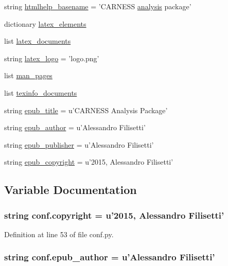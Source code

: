 \begin{DoxyCompactItemize}
\item 
string \hyperlink{a00101_aab7fddb2766ce3c430d8246fbfdbc7b1}{htmlhelp\-\_\-basename} = 'C\-A\-R\-N\-E\-S\-S \hyperlink{a00025_abf6e5638a23a2531114655f3f690b70c}{analysis} package'
\item 
dictionary \hyperlink{a00101_a33619d385ad23765ac6ebb58bf82d43d}{latex\-\_\-elements}
\item 
list \hyperlink{a00101_a7812f49970f3de0d15dd7b9b9a10e3a1}{latex\-\_\-documents}
\item 
string \hyperlink{a00101_a8baea114415f64e8f5aad390f5cd4230}{latex\-\_\-logo} = 'logo.\-png'
\item 
list \hyperlink{a00101_a85efc5fee48a26fa2d651f6eeb38fc2b}{man\-\_\-pages}
\item 
list \hyperlink{a00101_a54b0faed214ac92017d5689efbb10672}{texinfo\-\_\-documents}
\item 
string \hyperlink{a00101_a9e0d62d22b83ce34deb3f16ba63cedfe}{epub\-\_\-title} = u'C\-A\-R\-N\-E\-S\-S Analysis Package'
\item 
string \hyperlink{a00101_a986ebf7aa037c6bf39add300ab98a611}{epub\-\_\-author} = u'Alessandro Filisetti'
\item 
string \hyperlink{a00101_a13c40319d84c9383e0d119773cc1ed02}{epub\-\_\-publisher} = u'Alessandro Filisetti'
\item 
string \hyperlink{a00101_a443008520a058a726d07c6b5ccf45366}{epub\-\_\-copyright} = u'2015, Alessandro Filisetti'
\end{DoxyCompactItemize}


\subsection{Variable Documentation}
\hypertarget{a00101_a33fa97cf51dcb25970fbf53f10159589}{
\subsubsection[{copyright}]{\setlength{\rightskip}{0pt plus 5cm}string conf.\-copyright = u'2015, Alessandro Filisetti'}}\label{a00101_a33fa97cf51dcb25970fbf53f10159589}


Definition at line 53 of file conf.\-py.

\hypertarget{a00101_a986ebf7aa037c6bf39add300ab98a611}{
\subsubsection[{epub\-\_\-author}]{\setlength{\rightskip}{0pt plus 5cm}string conf.\-epub\-\_\-author = u'Alessandro Filisetti'}}\label{a00101_a986ebf7aa037c6bf39add300ab98a611}


